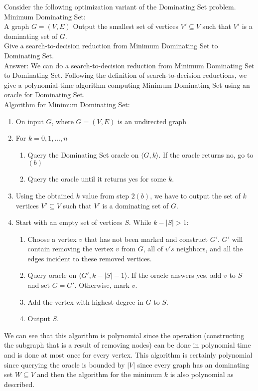 \documentclass{csc_assignment}
\begin{document}
\begin{description}
Consider the following optimization variant of the Dominating Set problem.\\
Minimum Dominating Set:\\
A graph $G = (V, E)$
Output the smallest set of vertices $V' \subseteq V$ such that $V'$ is a dominating set of $G$.\\
Give a search-to-decision reduction from Minimum Dominating Set to Dominating Set. \\

Answer: We can do a search-to-decision reduction from Minimum Dominating Set to Dominating Set. Following the definition of search-to-decision reductions, we give a polynomial-time algorithm computing Minimum Dominating Set using an oracle for Dominating Set. \\ Algorithm for Minimum Dominating Set: \begin{enumerate}
\item On input $G$, where $G = (V, E)$ is an undirected graph
\item For $k = 0, 1, \ldots, n$
\begin{enumerate} \item Query the Dominating Set oracle on $\langle G, k \rangle$. If the oracle returns no, go to $(b)$ 
\item Query the oracle until it returns yes for some $k$. \end{enumerate}
\item Using the obtained $k$ value from step $2(b)$, we have to output the set of $k$ vertices $V' \subseteq V$ such that $V'$ is a dominating set of $G$. 
\item Start with an empty set of vertices $S$. While $k - |S| > 1$: \begin{enumerate}
\item Choose a vertex $v$ that has not been marked and construct $G'$. $G'$ will contain removing the vertex $v$ from $G$, all of $v's$ neighbors, and all the edges incident to these removed vertices. \item Query oracle on $\langle G', k - |S| - 1 \rangle$. If the oracle answers yes, add $v$ to $S$ and set $G = G'$. Otherwise, mark $v$. \item Add the vertex with highest degree in $G$ to $S$. \item Output $S$.
\end {enumerate}
\end {enumerate}
We can see that this algorithm is polynomial since the operation (constructing the subgraph that is a result of removing nodes) can be done in polynomial time and is done at most once for every vertex. This algorithm is certainly polynomial since querying the oracle is bounded by $|V|$ since every graph has an dominating set $W \subseteq V$ and then the algorithm for the minimum $k$ is also polynomial as described.



\end{description}
\end{document}

